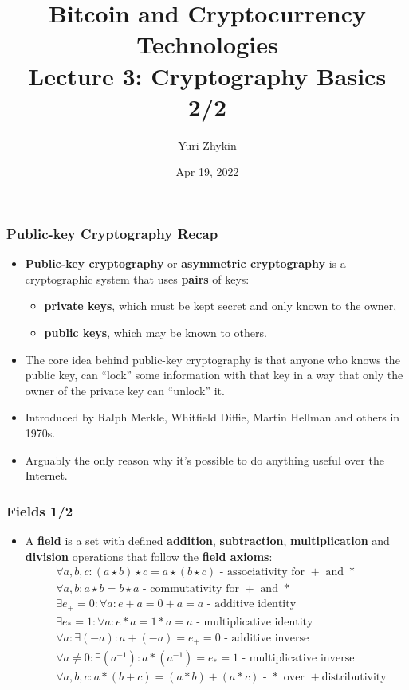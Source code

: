 \documentclass{beamer}
\title{
  Bitcoin and Cryptocurrency Technologies \\
  Lecture 3: Cryptography Basics 2/2
}
\author{Yuri Zhykin}
\date{Apr 19, 2022}
\begin{document}
\frame{\titlepage}

\begin{frame}
  \frametitle{Public-key Cryptography Recap}
  \begin{itemize}
  \item \textbf{Public-key cryptography} or \textbf{asymmetric cryptography} is
    a cryptographic system that uses \textbf{pairs} of keys:
    \begin{itemize}
    \item \textbf{private keys}, which must be kept secret and only known to the
      owner,
    \item \textbf{public keys}, which may be known to others.
    \end{itemize}
  \item The core idea behind public-key cryptography is that anyone who knows
    the public key, can ``lock'' some information with that key in a way that
    only the owner of the private key can ``unlock'' it.
  \item Introduced by Ralph Merkle, Whitfield Diffie, Martin Hellman and others
    in 1970s.
  \item Arguably the only reason why it's possible to do anything useful over
    the Internet.
  \end{itemize}
\end{frame}

\begin{frame}
  \frametitle{Fields 1/2}
  \begin{itemize}
  \item A \textbf{field} is a set with defined \textbf{addition},
    \textbf{subtraction}, \textbf{multiplication} and \textbf{division}
    operations that follow the \textbf{field axioms}:
    \begin{align*}
      &\forall a, b, c: (a \star b) \star c = a \star (b \star c) \text{ -
        associativity for $+$ and $*$} \\
      &\forall a, b: a \star b = b \star a \text{ - commutativity for $+$ and
        $*$} \\
      &\exists e_+ = 0: \forall a: e + a = 0 + a = a \text{ - additive identity}
      \\
      &\exists e_* = 1: \forall a: e * a = 1 * a = a \text{ - multiplicative
        identity} \\
      &\forall a: \exists (-a): a + (-a) = e_+ = 0 \text{ - additive inverse} \\
      &\forall a \neq 0: \exists (a^{-1}): a * (a^{-1}) = e_* = 1 \text{ -
        multiplicative inverse} \\
      &\forall a, b, c: a*(b+c) = (a*b) + (a*c) \text{ - $*$ over $+$
        distributivity} \\
    \end{align*}
  \end{itemize}
\end{frame}
\end{document}
